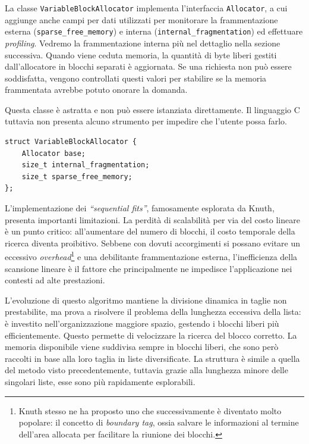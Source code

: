 La classe \texttt{VariableBlockAllocator} implementa l'interfaccia \texttt{Allocator}, a cui aggiunge anche campi per dati utilizzati per monitorare la frammentazione esterna (\texttt{sparse\_free\_memory}) e interna (\texttt{internal\_fragmentation}) ed effettuare \textit{profiling}. Vedremo la frammentazione interna più nel dettaglio nella sezione successiva. Quando viene ceduta memoria, la quantità di byte liberi gestiti dall'allocatore in blocchi separati è aggiornata. Se una richiesta non può essere soddisfatta, vengono controllati questi valori per stabilire se la memoria frammentata avrebbe potuto onorare la domanda. 

Questa classe è astratta e non può essere istanziata direttamente. Il linguaggio C tuttavia non presenta alcuno strumento per impedire che l'utente possa farlo.

\begin{lstlisting}
struct VariableBlockAllocator {
    Allocator base;
    size_t internal_fragmentation;
    size_t sparse_free_memory;
};
\end{lstlisting}

L'implementazione dei \textit{“sequential fits”}, famosamente esplorata da Knuth, presenta importanti limitazioni. La perdità di scalabilità per via del costo lineare è un punto critico: all’aumentare del numero di blocchi, il costo temporale della ricerca diventa proibitivo. Sebbene con dovuti accorgimenti si possano evitare un eccessivo \textit{overhead}\footnote{Knuth stesso ne ha proposto uno che successivamente è diventato molto popolare: il concetto di \textit{boundary tag}, ossia salvare le informazioni al termine dell'area allocata per facilitare la riunione dei blocchi.} e una debilitante frammentazione esterna, l’inefficienza della scansione lineare è il fattore che principalmente ne impedisce l'applicazione nei contesti ad alte prestazioni.

L’evoluzione di questo algoritmo mantiene la divisione dinamica in taglie non prestabilite, ma prova a risolvere il problema della lunghezza eccessiva della lista: è investito nell’organizzazione maggiore spazio, gestendo i blocchi liberi più efficientemente. Questo permette di velocizzare la ricerca del blocco corretto. La memoria disponibile viene suddivisa sempre in blocchi liberi, che sono però raccolti in base alla loro taglia in liste diversificate. La struttura è simile a quella del metodo visto precedentemente, tuttavia grazie alla lunghezza minore delle singolari liste, esse sono più rapidamente esplorabili.


